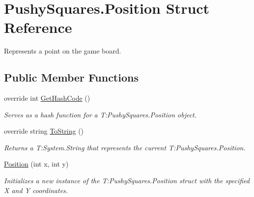 \hypertarget{struct_pushy_squares_1_1_position}{}\section{Pushy\+Squares.\+Position Struct Reference}
\label{struct_pushy_squares_1_1_position}


Represents a point on the game board.  


\subsection*{Public Member Functions}
\begin{DoxyCompactItemize}
\item 
override int \hyperlink{struct_pushy_squares_1_1_position_a2fbae2e4cc691860b1a475fd26450a4f}{Get\+Hash\+Code} ()
\begin{DoxyCompactList}\small\item\em Serves as a hash function for a T\+:\+Pushy\+Squares.\+Position object. \end{DoxyCompactList}\item 
override string \hyperlink{struct_pushy_squares_1_1_position_a2fa50254501b818be657fe8a0bf9d148}{To\+String} ()
\begin{DoxyCompactList}\small\item\em Returns a T\+:\+System.\+String that represents the current T\+:\+Pushy\+Squares.\+Position. \end{DoxyCompactList}\item 
\hyperlink{struct_pushy_squares_1_1_position_ad1f9a5ef218574d0e49635a8e7a23860}{Position} (int x, int y)
\begin{DoxyCompactList}\small\item\em Initializes a new instance of the T\+:\+Pushy\+Squares.\+Position struct with the specified X and Y coordinates. \end{DoxyCompactList}\end{DoxyCompactItemize}
